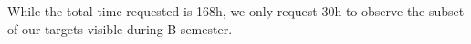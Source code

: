 \documentclass[11pt,preprint]{aastex_nofoot}
\begin{document}
While the total time requested is 168h, we only request 30h to observe the
subset of our targets visible during B semester.


\end{document}
